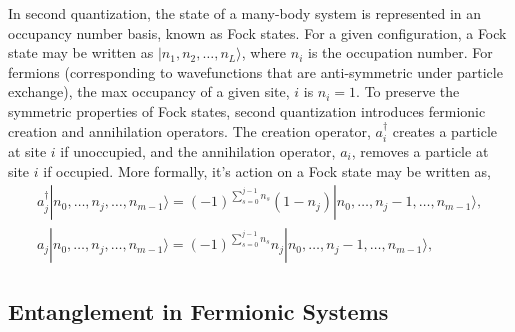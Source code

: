 In second quantization, the state of a many-body system is represented in an occupancy number basis, known as Fock states. For a given configuration, a Fock state may be written as $|n_1, n_2, \dots, n_L\rangle$, where $n_i$ is the occupation number. For fermions (corresponding to wavefunctions that are anti-symmetric under particle exchange), the max occupancy of a given site, $i$ is $n_i = 1$. To preserve the symmetric properties of Fock states, second quantization introduces fermionic creation and annihilation operators. The creation operator, $a^{\dagger}_{i}$ creates a particle at site $i$ if unoccupied, and the annihilation operator, $a_i$, removes a particle at site $i$ if occupied. More formally, it's action on a Fock state may be written as, 
\begin{align*}
    a_j^{\dagger} |n_0, \dots, n_j, \dots, n_{m-1}\rangle = {(-1)}^{\sum^{j-1}_{s=0}n_s} (1-n_j) |n_0, \dots, n_j - 1, \dots, n_{m-1}\rangle, \\
    a_j |n_0, \dots, n_j, \dots, n_{m-1}\rangle = {(-1)}^{\sum^{j-1}_{s=0}n_s} n_j |n_0, \dots, n_j - 1, \dots, n_{m-1}\rangle,
\end{align*}





\subsection{Entanglement in Fermionic Systems}